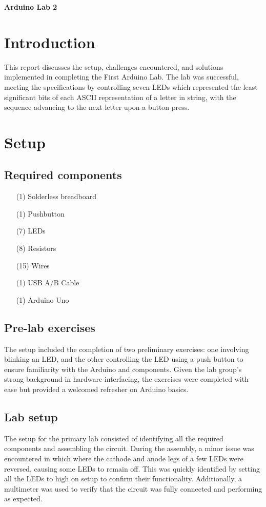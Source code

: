 \documentclass[fleqn]{article}
\begin{document}
\pagestyle{fancy}
\fancyhead{}
\fancyhead[R]{\thepage}
\fancyfoot{}

\begin{center}
    \Large{\textbf{Arduino Lab 2}}\\
\end{center}
\vspace{0.25in}

\section{Introduction}
This report discusses the setup, challenges encountered, and solutions implemented in completing the First Arduino Lab. The lab was successful, meeting the specifications by controlling seven LEDs which represented the least significant bits of each ASCII representation of a letter in string, with the sequence advancing to the next letter upon a button press.
\section{Setup}
\subsection{Required components}
\begin{itemize}
    \item[(1)] Solderless breadboard
    \item[(1)] Pushbutton
    \item[(7)] LEDs
    \item[(8)] Resistors
    \item[(15)] Wires
    \item[(1)] USB A/B Cable
    \item[(1)] Arduino Uno
\end{itemize}
\subsection{Pre-lab exercises}
The setup included the completion of two preliminary exercises: one involving blinking an LED, and the other controlling the LED using a push button to ensure familiarity with the Arduino and components. Given the lab group’s strong background in hardware interfacing, the exercises were completed with ease but provided a welcomed refresher on Arduino basics. 
\subsection{Lab setup}
The setup for the primary lab consisted of identifying all the required components and assembling the circuit. During the assembly, a minor issue was encountered in which where the cathode and anode legs of a few LEDs were reversed, causing some LEDs to remain off. This was quickly identified by setting all the LEDs to high on setup to confirm their functionality. Additionally, a multimeter was used to verify that the circuit was fully connected and performing as expected.
\end{document}

